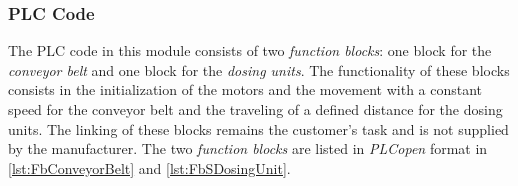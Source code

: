    
    
\subsubsection{PLC Code}
   The PLC code in this module consists of two \textit{function blocks}: one block for the \textit{conveyor belt} and one block for the \textit{dosing units}. The functionality of these blocks consists in the initialization of the motors and the movement with a constant speed for the conveyor belt and the traveling of a defined distance for the dosing units. The linking of these blocks remains the customer's task and is not supplied by the manufacturer. The two \textit{function blocks} are listed in \textit{PLCopen} format in \autoref{lst:FbConveyorBelt} and \autoref{lst:FbSDosingUnit}. 
  
  
